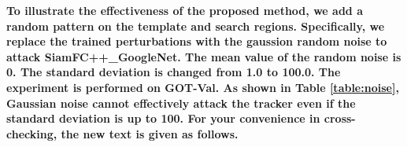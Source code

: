 \documentclass[12pt]{article}
\begin{document}
\textbf{To illustrate the effectiveness of the proposed method, we add a random pattern on the template and search regions. 
Specifically, we replace the trained perturbations with the gaussion random noise to attack SiamFC++\_GoogleNet. The mean value of the random noise is 0. The standard deviation is changed from 1.0 to 100.0. The experiment is performed on GOT-Val.
As shown in Table \ref{table:noise}, Gaussian noise cannot effectively attack the tracker even if the standard deviation is up to 100.
For your convenience in cross-checking, the new text is given as follows.
}

\end{document}
